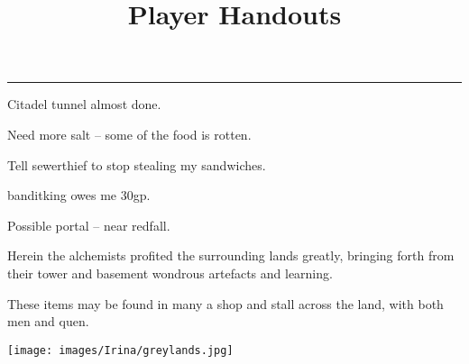 \documentclass[a4paper,openany]{book}
\title{Player Handouts}
\begin{document}
\frontmatter



\pagebreak


\hrule

\vspace{2em}

Citadel tunnel almost done.

Need more salt -- some of the food is rotten.

Tell \gls{sewerthief} to stop stealing my sandwiches.

\Gls{banditking} owes me 30gp.

Possible portal -- near \gls{redfall}.

\pagebreak



\begin{center}
\begin{minipage}{.7\textwidth}
\Large
Herein the alchemists profited the surrounding lands greatly, bringing forth from their tower and basement wondrous artefacts and learning.

These items may be found in many a shop and stall across the land, with both men and quen.

\end{minipage}
\end{center}

\pagebreak



\pagebreak

\texttt{[image: images/Irina/greylands.jpg]}

\pagebreak



\pagebreak


\pagebreak

\end{document}
